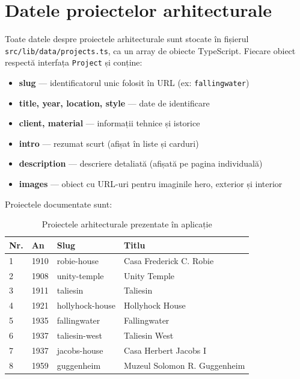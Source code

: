 \documentclass[12pt,a4paper]{report}
\begin{document}
\section{Datele proiectelor arhitecturale}

Toate datele despre proiectele arhitecturale sunt stocate în fișierul
\texttt{src/lib/data/projects.ts}, ca un array de obiecte TypeScript. Fiecare
obiect respectă interfața \texttt{Project} și conține:

\begin{itemize}
  \item \textbf{slug} --- identificatorul unic folosit în URL (ex: \texttt{fallingwater})
  \item \textbf{title, year, location, style} --- date de identificare
  \item \textbf{client, material} --- informații tehnice și istorice
  \item \textbf{intro} --- rezumat scurt (afișat în liste și carduri)
  \item \textbf{description} --- descriere detaliată (afișată pe pagina individuală)
  \item \textbf{images} --- obiect cu URL-uri pentru imaginile hero, exterior și interior
\end{itemize}

Proiectele documentate sunt:

\begin{table}[H]
  \centering
  \caption{Proiectele arhitecturale prezentate în aplicație}
  \label{tab:projects}
  \begin{tabularx}{\textwidth}{l l >{\ttfamily}l X}
    \toprule
    \textbf{Nr.} & \textbf{An} & \textbf{Slug} & \textbf{Titlu} \\
    \midrule
    1 & 1910 & robie-house     & Casa Frederick C. Robie \\
    2 & 1908 & unity-temple    & Unity Temple \\
    3 & 1911 & taliesin        & Taliesin \\
    4 & 1921 & hollyhock-house & Hollyhock House \\
    5 & 1935 & fallingwater    & Fallingwater \\
    6 & 1937 & taliesin-west   & Taliesin West \\
    7 & 1937 & jacobs-house    & Casa Herbert Jacobs I \\
    8 & 1959 & guggenheim      & Muzeul Solomon R. Guggenheim \\
    \bottomrule
  \end{tabularx}
\end{table}
\end{document}
